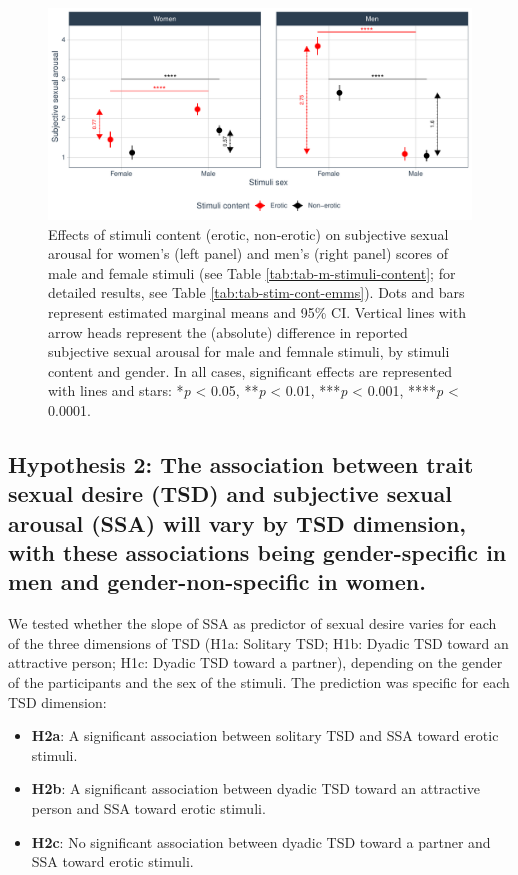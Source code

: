 \documentclass[
  bookmarksnumbered]{article}
\providecommand{\tightlist}{%
  \setlength{\itemsep}{0pt}\setlength{\parskip}{0pt}}
\begin{document}
\begin{figure}
\centering
\includegraphics{Sexual_Desire_Arousal_V2_files/figure-latex/fig-m-stimuli-content-1.pdf}
\caption{\label{fig:fig-m-stimuli-content}Effects of stimuli content (erotic, non-erotic) on subjective sexual arousal for women's (left panel) and men's (right panel) scores of male and female stimuli (see Table \ref{tab:tab-m-stimuli-content}; for detailed results, see Table \ref{tab:tab-stim-cont-emms}). Dots and bars represent estimated marginal means and 95\% CI. Vertical lines with arrow heads represent the (absolute) difference in reported subjective sexual arousal for male and femnale stimuli, by stimuli content and gender. In all cases, significant effects are represented with lines and stars: *\emph{p} \textless{} 0.05, **\emph{p} \textless{} 0.01, ***\emph{p} \textless{} 0.001, ****\emph{p} \textless{} 0.0001.}
\end{figure}

\subsection{Hypothesis 2: The association between trait sexual desire (TSD) and subjective sexual arousal (SSA) will vary by TSD dimension, with these associations being gender-specific in men and gender-non-specific in women.}\label{hyp2}

We tested whether the slope of SSA as predictor of sexual desire varies for each of the three dimensions of TSD (H1a: Solitary TSD; H1b: Dyadic TSD toward an attractive person; H1c: Dyadic TSD toward a partner), depending on the gender of the participants and the sex of the stimuli. The prediction was specific for each TSD dimension:

\begin{itemize}
\tightlist
\item
  \textbf{H2a}: A significant association between solitary TSD and SSA toward erotic stimuli.
\item
  \textbf{H2b}: A significant association between dyadic TSD toward an attractive person and SSA toward erotic stimuli.
\item
  \textbf{H2c}: No significant association between dyadic TSD toward a partner and SSA toward erotic stimuli.
\end{itemize}
\end{document}
